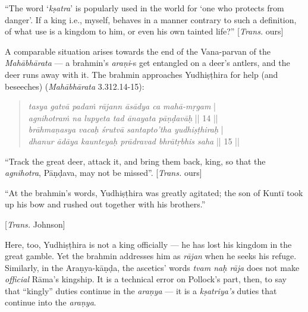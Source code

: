 \begin{myquote}
“The word ‘{\sl kṣatra}’ is popularly used in the world for ‘one who protects from danger’. If a king i.e., myself, behaves in a manner contrary to such a definition, of what use is a kingdom to him, or even his own tainted life?” 
\hfill[{\sl Trans.} ours]
\end{myquote}

A comparable situation arises towards the end of the Vana-parvan of the {\sl Mahābhārata} --- a brahmin’s {\sl araṇi}-s get entangled on a deer’s antlers, and the deer runs away with it. The brahmin approaches Yudhiṣṭhira for help (and beseeches) ({\sl Mahābhārata} 3.312.14-15): 

\newpage

\begin{quote}
{{\sl tasya gatvā padaṁ rājann āsādya ca mahā-mṛgam}} |\\
{\sl agnihotraṁ na lupyeta tad ānayata pāṇḍavāḥ} || 14 ||\\
{\sl brāhmaṇasya vacaḥ śrutvā santapto’tha yudhiṣṭhiraḥ} |\\
{\sl dhanur ādāya kaunteyaḥ prādravad bhrātṛbhis saha} || 15 ||
\end{quote}


\begin{myquote}
“Track the great deer, attack it, and bring them back, king, so that the {\sl agnihotra}, Pāṇḍava, may not be missed”. [{\sl Trans.} ours]

“At the brahmin’s words, Yudhiṣṭhira was greatly agitated; the son of Kuntī took up his bow and rushed out together with his brothers.”

\hfill [{\sl Trans.} Johnson]
\end{myquote}

Here, too, Yudhiṣṭhira is not a king officially --- he has lost his kingdom in the great gamble. Yet the brahmin addresses him as {\sl rājan} when he seeks his refuge. Similarly, in the Araṇya-kāṇḍa, the ascetics’ words {\sl tvam naḥ rāja} does not make {\sl official} Rāma’s kingship. It is a technical error on Pollock’s part, then, to say that “kingly” duties continue in the {\sl araṇya} --- it is a {\sl kṣatriya’s} duties that continue into the {\sl araṇya}.

